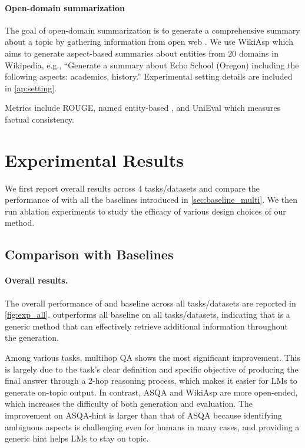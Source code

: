 \paragraph{Open-domain summarization}
The goal of open-domain summarization is to generate a comprehensive summary about a topic by gathering information from open web \cite{openmds-giorgi-2022}.
We use WikiAsp \cite{wikiasp-hayashi-2021} which aims to generate aspect-based summaries about entities from 20 domains in Wikipedia, e.g., ``Generate a summary about Echo School (Oregon) including the following aspects: academics, history.''
Experimental setting details are included in \autoref{ap:setting}.

Metrics include ROUGE, named entity-based \fone, and UniEval \cite{unieval-zhong-2023} which measures factual consistency.

\section{Experimental Results}
We first report overall results across 4 tasks/datasets and compare the performance of \ours with all the baselines introduced in \autoref{sec:baseline_multi}.
We then run ablation experiments to study the efficacy of various design choices of our method.

\subsection{Comparison with Baselines}\label{sec:exp_main}
\paragraph{Overall results.}
The overall performance of \ours and baseline across all tasks/datasets are reported in \autoref{fig:exp_all}.
\ours outperforms all baseline on all tasks/datasets, indicating that \ours is a generic method that can effectively retrieve additional information throughout the generation.

Among various tasks, multihop QA shows the most significant improvement.
This is largely due to the task's clear definition and specific objective of producing the final answer through a 2-hop reasoning process, which makes it easier for LMs to generate on-topic output.
In contrast, ASQA and WikiAsp are more open-ended, which increases the difficulty of both generation and evaluation.
The improvement on ASQA-hint is larger than that of ASQA because identifying ambiguous aspects is challenging even for humans in many cases, and providing a generic hint helps LMs to stay on topic.

